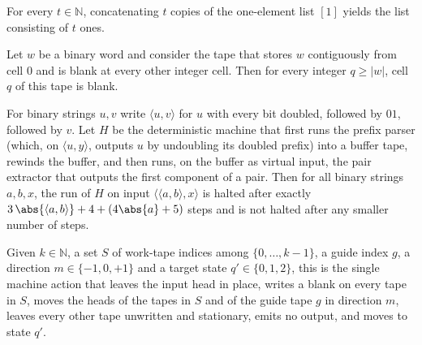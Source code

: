 \begin{lemma}
\label{Turing.un_flatten}
\leanok
{}
For every $t\in\mathbb{N}$, concatenating $t$ copies of the one-element list $[1]$ yields the
list consisting of $t$ ones.
\end{lemma}

\begin{lemma}
\label{Turing.un_buffer_ge}
\leanok
{}
Let $w$ be a binary word and consider the tape that stores $w$ contiguously from cell $0$ and is
blank at every other integer cell. Then for every integer $q\ge |w|$, cell $q$ of this tape is
blank.
\end{lemma}

\begin{theorem}
\label{Turing.un_canon_halt}
\leanok
{}
For binary strings $u,v$ write $\langle u,v\rangle$ for $u$ with every bit doubled, followed by
$01$, followed by $v$. Let $H$ be the deterministic machine that first runs the prefix parser (which, on
$\langle u,y\rangle$, outputs $u$ by undoubling its doubled prefix) into a buffer tape, rewinds
the buffer, and then runs, on the buffer as virtual input, the pair extractor that outputs the
first component of a pair. Then for all binary strings $a,b,x$, the run of $H$ on input
$\langle\langle a,b\rangle,x\rangle$ is halted after exactly
$3\,\abs{\langle a,b\rangle}+4+(4\abs{a}+5)$ steps and is not halted after any smaller number of
steps.
\end{theorem}

\begin{definition}
\label{Turing.un_bankAct}
\leanok
{}
Given $k\in\mathbb{N}$, a set $S$ of work-tape indices among $\{0,\dots,k-1\}$, a guide index
$g$, a direction $m\in\{-1,0,+1\}$ and a target state $q'\in\{0,1,2\}$, this is the single
machine action that leaves the input head in place, writes a blank on every tape in $S$, moves
the heads of the tapes in $S$ and of the guide tape $g$ in direction $m$, leaves every other
tape unwritten and stationary, emits no output, and moves to state $q'$.
\end{definition}


